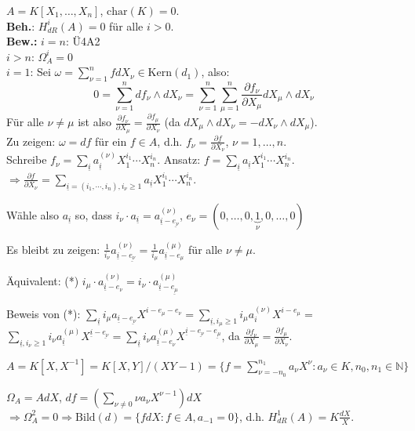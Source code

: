 \begin{nnBsp}
$A=K[X_1, \ldots, X_n]$, $\textrm{char}(K)=0$.\\
\textbf{Beh.}: $H_{dR}^i(A) = 0$ f\"ur alle $i>0$.\\
\textbf{Bew.: } $i=n$: \"U4A2\\
$i>n$: $\Omega_A^i=0$\\
$i=1$: Sei $\omega=\sum_{\nu=1}^nf dX_\nu\in \textrm{Kern}(d_1)$, also:
\[
0=\sum_{\nu=1}^n df_\nu \wedge dX_\nu=\sum_{\nu=1}^n \sum_{\mu=1}^n
\frac{\partial f_\nu}{\partial X_\mu}dX_\mu\wedge dX_\nu
\]
F\"ur alle $\nu\neq \mu$ ist also $\frac{\partial f_\nu}{\partial X_\mu}=\frac{\partial f_\mu}{\partial X_\nu}$
(da $dX_\mu\wedge dX_\nu = -dX_\nu\wedge dX_\mu$).\\
Zu zeigen: $\omega = df$ f\"ur ein $f\in A$, d.h. $f_\nu=\frac{\partial f}{\partial X_\nu}$, $\nu=1, \ldots, n$.\\
Schreibe $f_\nu=\sum_{\underline{i}} a_{\underline{i}}^{(\nu)}X_1^{i_1}\cdots X_n^{i_n}$.
Ansatz: $f=\sum_{\underline{i}} a_{\underline{i}} X_1^{i_1}\cdots X_n^{i_n}$.
$\Rightarrow \frac{\partial f}{\partial X_\nu}
=\sum_{\underline{i}=(i_1, \cdots, i_n), i_\nu\geq 1}a_{\underline{i}} X_1^{i_1}\cdots X_n^{i_n}$.

W\"ahle also $a_{\underline{i}}$ so, dass $i_\nu\cdot a_{\underline{i}} = a_{\underline{i}-\underline{e_\nu}}^{(\nu)}$,
$e_\nu=(0,\ldots,0,\underbrace{1}_{\nu},0,\ldots, 0)$

Es bleibt zu zeigen: $\frac{1}{i_\nu} a_{\underline{i}-\underline{e_\nu}}^{(\nu)}
=\frac{1}{i_\mu} a_{\underline{i}-e_\mu}^{(\mu)}$ f\"ur alle $\nu\neq \mu$.

\"Aquivalent: (*) $i_\mu\cdot a_{\underline{i}-e_{\nu}}^{(\nu)}=i_\nu \cdot a_{\underline{i}-\underline{e_\mu}}^{(\mu)}$

Beweis von (*): $
\sum_{\underline{i}} i_\mu a_{\underline{i}-\underline{e_\nu}}X^{i-e_\mu-e_\nu}
= \sum_{\underline{i}, i_\mu\geq 1} i_\mu a_{i}^{(\nu)} X^{i-e_\mu}=$\\
$\sum_{\underline{i}, i_\nu\geq 1}i_\nu a_{\underline{i}}^{(\mu)}X^{\underline{i}-\underline{e_\nu}}
= \sum_{\underline{i}} i_\nu a_{\underline{i}-e_\nu}^{(\mu)}X^{\underline{i}-\underline{e_\nu}-\underline{e_\mu}}$,
da $\frac{\partial f_\nu}{\partial X_\mu} = \frac{\partial f_\mu}{\partial X_\nu}$.
\end{nnBsp}

\begin{nnBsp}
$A=K[X, X^{-1}]=K[X,Y]/(XY-1)=\{f=\sum_{\nu=-n_0}^{n_1} a_\nu X^\nu: a_\nu\in K, n_0, n_1\in \mathbb{N}\}$

$\Omega_A=AdX$, $df=(\sum_{\nu\neq 0}\nu a_\nu X^{\nu-1})dX$
$\Rightarrow \Omega_A^2 = 0 \Rightarrow \textrm{Bild}(d)=\{fdX:f\in A, a_{-1}=0\}$,
d.h. $H_{dR}^{1}(A) = K\frac{dX}{X}$.
\end{nnBsp}
